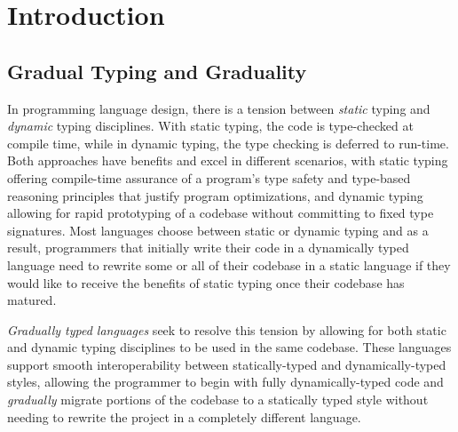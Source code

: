\section{Introduction}
  
\subsection{Gradual Typing and Graduality}
In programming language design, there is a tension between \emph{static} typing
and \emph{dynamic} typing disciplines. With static typing, the code is
type-checked at compile time, while in dynamic typing, the type checking is
deferred to run-time. Both approaches have benefits and excel in different
scenarios, with static typing offering compile-time assurance of a program's
type safety and type-based reasoning principles that justify program
optimizations, and dynamic typing allowing for rapid prototyping of a codebase
without committing to fixed type signatures.
%
Most languages choose between static or dynamic typing and as a result,
programmers that initially write their code in a dynamically typed language need
to rewrite some or all of their codebase in a static language if they would like
to receive the benefits of static typing once their codebase has matured.

\emph{Gradually typed languages} \cite{siek-taha06, tobin-hochstadt06} seek to
resolve this tension by allowing for both static and dynamic typing disciplines
to be used in the same codebase. These languages support smooth interoperability
between statically-typed and dynamically-typed styles, allowing the programmer to
begin with fully dynamically-typed code and \emph{gradually} migrate portions of the
codebase to a statically typed style without needing to rewrite the project in a
completely different language.


